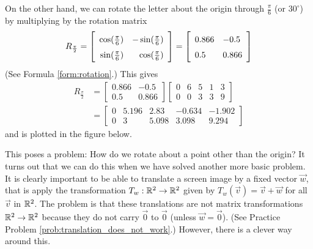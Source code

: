 \documentclass{ximera}
\begin{document}
On the other hand, we can rotate the letter about the origin through $\frac{\pi}{6}$ (or $30^\circ$) by multiplying by the rotation matrix  $$R_{\frac{\pi}{2}} = \left[
\def\arraystretch{1.5}\begin{array}{rr}
\cos(\frac{\pi}{6}) & -\sin(\frac{\pi}{6})\\
\sin(\frac{\pi}{6}) & \cos(\frac{\pi}{6})
\end{array}
\right] = \left[
\begin{array}{ll}
0.866 & -0.5\\
0.5 & 0.866
\end{array}
\right]$$
(See Formula \ref{form:rotation}.)  This gives
\begin{align*}
R_{\frac{\pi}{2}} &= \left[
\begin{array}{ll}
0.866 & -0.5\\
0.5 & 0.866
\end{array}
\right] \left[
\begin{array}{rrrrr}
0 & 6 & 5 & 1 & 3\\
0 & 0 & 3 & 3 & 9
\end{array}
\right] \\ &=
\left[
\begin{array}{lllrr}
0 & 5.196 & 2.83 & -0.634 & -1.902\\
0 & 3 & 5.098 & 3.098 & 9.294
\end{array}
\right]
\end{align*}
and is plotted in the figure below.

 \begin{center}
\end{center}  

This poses a problem: How do we rotate
about a point other than the origin? It turns out that we can do this when
we have solved another more basic problem. It is clearly important to be
 able to translate a screen image by a fixed vector $\vec{w}$, that is apply the transformation $T_{w} : \mathbb{R}^2 \to \mathbb{R}^2$ given by $T_{w}(\vec{v}) = \vec{v} + \vec{w}$ for all $\vec{v}$ in $\mathbb{R}^2$. The problem is that these translations are not matrix transformations $\mathbb{R}^2 \to \mathbb{R}^2$ because they do not carry $\vec{0}$ to $\vec{0}$ (unless $\vec{w} = \vec{0}$). (See Practice Problem \ref{prob:translation_does_not_work}.) However, there is a clever way around this.
\end{document}
